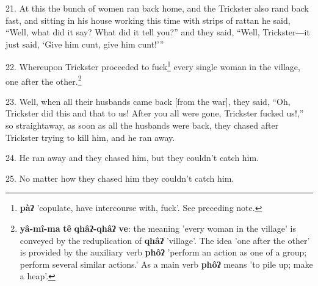 21. At this the bunch of women ran back home, and the Trickster also rand back
fast, and sitting in his house working this time with strips of rattan he said,
``Well, what did it say? What did it tell you?'' and they said, ``Well, Trickster―it
just said, `Give him cunt, give him cunt!'''

22. Whereupon Trickster proceeded to fuck\footnote{\textbf{pàʔ} 'copulate, have intercourse with, fuck'. See preceding note.} every single woman in the village,
one after the other.\footnote{\textbf{yâ-mî-ma} \textbf{tê} \textbf{qhâʔ-qhâʔ} \textbf{ve}: the meaning 'every woman in the village' is conveyed by the reduplication of \textbf{qhâʔ} 'village'. The idea 'one after the other' is provided by the auxiliary verb \textbf{phôʔ} 'perform an action as one of a group; perform several similar actions.' As a main verb \textbf{phôʔ} means 'to pile up; make a heap'.}

23. Well, when all their husbands came back [from the war], they said, ``Oh, Trickster
did this and that to us! After you all were gone, Trickster fucked us!,'' so straightaway,
as soon as all the husbands were back, they chased after Trickster trying to kill
him, and he ran away.

24. He ran away and they chased him, but they couldn't catch him.

25. No matter how they chased him they couldn't catch him.

